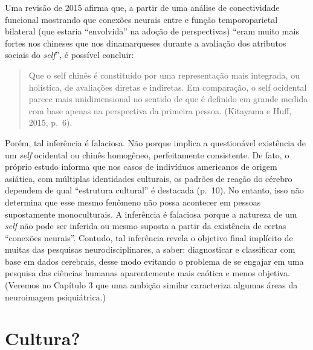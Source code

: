 Uma revisão de 2015 afirma que, a partir de uma análise de conectividade
funcional mostrando que conexões neurais entre  e função
temporoparietal bilateral (que estaria ``envolvida'' na adoção de
perspectivas) ``eram muito mais fortes nos chineses que nos
dinamarqueses durante a avaliação dos atributos sociais do \emph{self}'', é
possível concluir:

\begin{quote}
Que o self chinês é constituído por uma representação mais integrada, ou
holística, de avaliações diretas e indiretas. Em comparação, o self
ocidental parece mais unidimensional no sentido de que é definido em
grande medida com base apenas na perspectiva da primeira pessoa.
(Kitayama e Huff, 2015, p.~6).
\end{quote}

Porém, tal inferência é falaciosa. Não porque implica a questionável
existência de um \emph{self} ocidental ou chinês homogêneo, perfeitamente
consistente. De fato, o próprio estudo informa que nos casos de
indivíduos americanos de origem asiática, com múltiplas identidades
culturais, os padrões de reação do cérebro dependem de qual ``estrutura
cultural'' é destacada (p.~10). No entanto, isso não determina que esse
mesmo fenômeno não possa acontecer em pessoas supostamente
monoculturais. A inferência é falaciosa porque a natureza de um \emph{self} não
pode ser inferida ou mesmo suposta a partir da existência de certas
``conexões neurais''. Contudo, tal inferência revela o objetivo final
implícito de muitas das pesquisas neurodisciplinares, a saber:
diagnosticar e classificar com base em dados cerebrais, desse modo
evitando o problema de se engajar em uma pesquisa das ciências humanas
aparentemente mais caótica e menos objetiva. (Veremos no Capítulo 3 que
uma ambição similar caracteriza algumas áreas da neuroimagem
psiquiátrica.)

\section{Cultura?}

